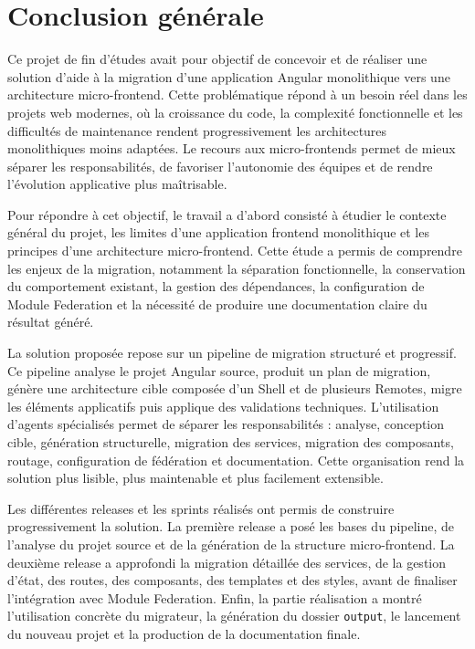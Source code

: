 \chapter*{Conclusion générale}

Ce projet de fin d'études avait pour objectif de concevoir et de réaliser une solution d'aide à la migration d'une application Angular monolithique vers une architecture micro-frontend. Cette problématique répond à un besoin réel dans les projets web modernes, où la croissance du code, la complexité fonctionnelle et les difficultés de maintenance rendent progressivement les architectures monolithiques moins adaptées. Le recours aux micro-frontends permet de mieux séparer les responsabilités, de favoriser l'autonomie des équipes et de rendre l'évolution applicative plus maîtrisable.

Pour répondre à cet objectif, le travail a d'abord consisté à étudier le contexte général du projet, les limites d'une application frontend monolithique et les principes d'une architecture micro-frontend. Cette étude a permis de comprendre les enjeux de la migration, notamment la séparation fonctionnelle, la conservation du comportement existant, la gestion des dépendances, la configuration de Module Federation et la nécessité de produire une documentation claire du résultat généré.

La solution proposée repose sur un pipeline de migration structuré et progressif. Ce pipeline analyse le projet Angular source, produit un plan de migration, génère une architecture cible composée d'un Shell et de plusieurs Remotes, migre les éléments applicatifs puis applique des validations techniques. L'utilisation d'agents spécialisés permet de séparer les responsabilités : analyse, conception cible, génération structurelle, migration des services, migration des composants, routage, configuration de fédération et documentation. Cette organisation rend la solution plus lisible, plus maintenable et plus facilement extensible.

Les différentes releases et les sprints réalisés ont permis de construire progressivement la solution. La première release a posé les bases du pipeline, de l'analyse du projet source et de la génération de la structure micro-frontend. La deuxième release a approfondi la migration détaillée des services, de la gestion d'état, des routes, des composants, des templates et des styles, avant de finaliser l'intégration avec Module Federation. Enfin, la partie réalisation a montré l'utilisation concrète du migrateur, la génération du dossier \texttt{output}, le lancement du nouveau projet et la production de la documentation finale.

